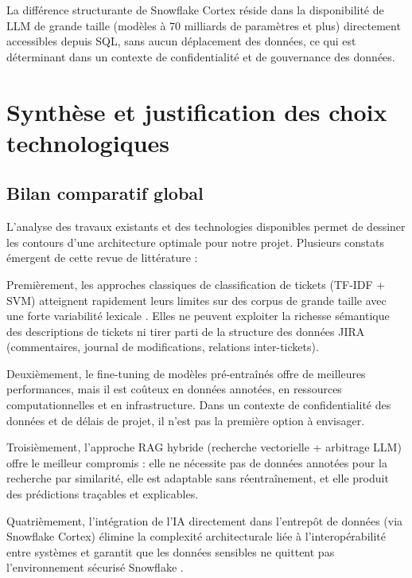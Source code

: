 La différence structurante de Snowflake Cortex réside dans la disponibilité de LLM de grande taille (modèles à 70 milliards de paramètres et plus) directement accessibles depuis SQL, sans aucun déplacement des données, ce qui est déterminant dans un contexte de confidentialité et de gouvernance des données.

\section{Synthèse et justification des choix technologiques}

\subsection{Bilan comparatif global}

L'analyse des travaux existants et des technologies disponibles permet de dessiner les contours d'une architecture optimale pour notre projet. Plusieurs constats émergent de cette revue de littérature :

Premièrement, les approches classiques de classification de tickets (TF-IDF + SVM) atteignent rapidement leurs limites sur des corpus de grande taille avec une forte variabilité lexicale \cite{logo:antoniol2008, logo:lamkanfi2010}. Elles ne peuvent exploiter la richesse sémantique des descriptions de tickets ni tirer parti de la structure des données JIRA (commentaires, journal de modifications, relations inter-tickets).

Deuxièmement, le fine-tuning de modèles pré-entraînés offre de meilleures performances, mais il est coûteux en données annotées, en ressources computationnelles et en infrastructure. Dans un contexte de confidentialité des données et de délais de projet, il n'est pas la première option à envisager.

Troisièmement, l'approche RAG hybride (recherche vectorielle + arbitrage LLM) offre le meilleur compromis \cite{logo:rag, logo:advanced_rag} : elle ne nécessite pas de données annotées pour la recherche par similarité, elle est adaptable sans réentraînement, et elle produit des prédictions traçables et explicables.

Quatrièmement, l'intégration de l'IA directement dans l'entrepôt de données (via Snowflake Cortex) élimine la complexité architecturale liée à l'interopérabilité entre systèmes et garantit que les données sensibles ne quittent pas l'environnement sécurisé Snowflake \cite{logo:snowflake_cortex}.

